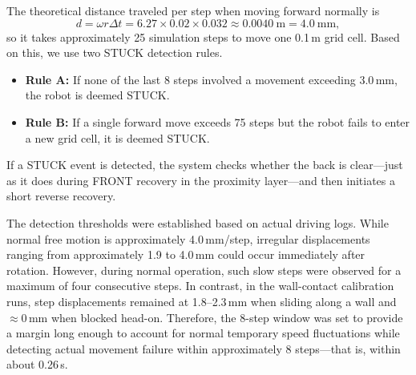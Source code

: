 The theoretical distance traveled per step when moving forward normally is 
\begin{equation}
d = \omega r \Delta t
  = 6.27 \times 0.02 \times 0.032
  \approx 0.0040~\mathrm{m}
  = 4.0~\mathrm{mm},
\end{equation}
so it takes approximately 25 simulation steps to move one 0.1\,m grid cell. 
Based on this, we use two STUCK detection rules. 
\begin{itemize}
    \item \textbf{Rule A:} If none of the last 8 steps involved a movement exceeding 3.0\,mm, the robot is deemed STUCK. 
    \item \textbf{Rule B:} If a single forward move exceeds 75 steps but the robot fails to enter a new grid cell, it is deemed STUCK.
\end{itemize}

If a STUCK event is detected, the system checks whether the back is clear---just as it does during FRONT recovery in the proximity layer---and then initiates a short reverse recovery. 

The detection thresholds were established based on actual driving logs. While normal free motion is approximately 4.0\,mm/step, irregular displacements ranging from approximately 1.9 to 4.0\,mm could occur immediately after rotation.
However, during normal operation, such slow steps were observed for a maximum of four consecutive steps. 
In contrast, in the wall-contact calibration runs, step displacements remained at 1.8--2.3\,mm when sliding along a wall and $\approx$0\,mm when blocked head-on.
Therefore, the 8-step window was set to provide a margin long enough to account for normal temporary speed fluctuations while detecting actual movement failure within approximately 8 steps---that is, within about 0.26\,s.

